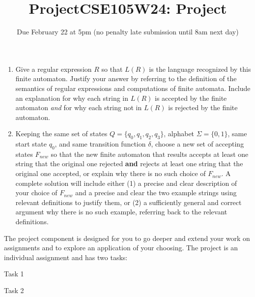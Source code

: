 \begin{enumerate}[wide, labelwidth=!, labelindent=0pt]
\begin{enumerate}
    \item Give a regular expression $R$ so that $L(R)$ is the language 
    recognized by this finite automaton. Justify your answer by referring to the 
    definition of the semantics of regular expressions and computations of finite automata. 
    Include an explanation for why each string in $L(R)$ is accepted by the finite automaton {\it and}
    for why each string not in $L(R)$ is rejected by the finite automaton.

    \item  Keeping the same set of states $Q = \{q_0, q_1, q_2, q_3\}$, alphabet $\Sigma = \{0,1\}$, 
    same start state $q_0$, and same transition 
    function $\delta$, choose a new set of accepting states $F_{new}$ so that the new 
    finite automaton that results accepts at least one string that the original one rejected {\bf and} rejects
    at least one string that the original one accepted, or explain why there is no such choice of $F_{new}$.
    A complete solution will include either (1) a precise and
    clear description of your choice of $F_{new}$
    and a precise and clear the two example strings using relevant definitions 
    to justify them, or (2) a sufficiently general and correct argument
    why there is no such example, referring back to the relevant definitions.

    \end{enumerate}
    
    \end{enumerate}
\newpage
\titleformat{\subsubsection}[runin]
   {\normalfont\bfseries}{}{}{}
   
\title{ProjectCSE105W24: Project}
\date{Due February 22 at 5pm (no penalty late submission until 8am next day)}


\maketitle

\thispagestyle{fancy}


The project component is designed for you to go deeper and extend your work on assignments 
and to explore an application of your choosing. 
The project is an individual assignment and has two tasks: 

Task 1

Task 2



